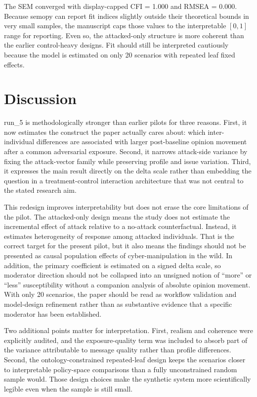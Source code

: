 \documentclass[11pt]{article}
\begin{document}
    The SEM converged with display-capped CFI = 1.000 and RMSEA = 0.000. Because semopy can report fit indices slightly outside their theoretical bounds in very small samples, the manuscript caps those values to the interpretable $[0,1]$ range for reporting. Even so, the attacked-only structure is more coherent than the earlier control-heavy designs. Fit should still be interpreted cautiously because the model is estimated on only 20 scenarios with repeated leaf fixed effects.

\section{Discussion}
run\_5 is methodologically stronger than earlier pilots for three reasons. First, it now estimates the construct the paper actually cares about: which inter-individual differences are associated with larger post-baseline opinion movement after a common adversarial exposure. Second, it narrows attack-side variance by fixing the attack-vector family while preserving profile and issue variation. Third, it expresses the main result directly on the delta scale rather than embedding the question in a treatment-control interaction architecture that was not central to the stated research aim.

    This redesign improves interpretability but does not erase the core limitations of the pilot. The attacked-only design means the study does not estimate the incremental effect of attack relative to a no-attack counterfactual. Instead, it estimates heterogeneity of response among attacked individuals. That is the correct target for the present pilot, but it also means the findings should not be presented as causal population effects of cyber-manipulation in the wild. In addition, the primary coefficient is estimated on a signed delta scale, so moderator direction should not be collapsed into an unsigned notion of “more” or “less” susceptibility without a companion analysis of absolute opinion movement. With only 20 scenarios, the paper should be read as workflow validation and model-design refinement rather than as substantive evidence that a specific moderator has been established.

Two additional points matter for interpretation. First, realism and coherence were explicitly audited, and the exposure-quality term was included to absorb part of the variance attributable to message quality rather than profile differences. Second, the ontology-constrained repeated-leaf design keeps the scenarios closer to interpretable policy-space comparisons than a fully unconstrained random sample would. Those design choices make the synthetic system more scientifically legible even when the sample is still small.
\end{document}

